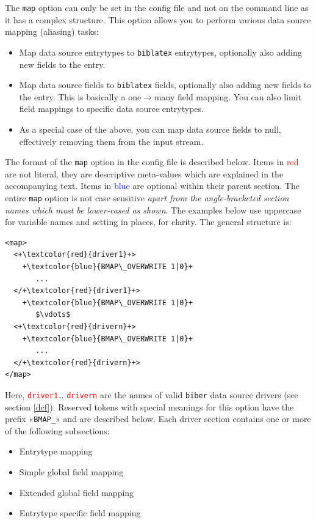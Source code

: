 \documentclass{ltxdockit}
\begin{document}
The \verb+map+ option can only be set in the config file
and not on the command line as it has a complex structure. This
option allows you to perform various data source mapping (aliasing)
tasks:

\begin{itemize}
\item Map data source entrytypes to \verb+biblatex+ entrytypes,
  optionally also adding new fields to the entry.
\item Map data source fields to \verb+biblatex+ fields,
  optionally also adding new fields to the entry. This is basically a
  one$\rightarrow$many field mapping. You can also limit field
  mappings to specific data source entrytypes.
\item As a special case of the above, you can map data source fields
  to null, effectively removing them from the input stream.
\end{itemize}

\noindent The format of the \verb+map+ option in the
config file is described below. Items in \textcolor{red}{red} are not
literal, they are descriptive meta-values which are explained in the
accompanying text. Items in \textcolor{blue}{blue} are optional within
their parent section. The entire \verb+map+ option is not case sensitive
\emph{apart from the angle-bracketed section names which must be
  lower-cased as shown}. The examples below use uppercase for variable names
and setting in places, for clarity. The general structure is:

\lstset{showspaces=false}
\begin{lstlisting}[escapechar=+,mathescape=true]
<map>
  <+\textcolor{red}{driver1}+>
    +\textcolor{blue}{BMAP\_OVERWRITE 1|0}+
       ...
  </+\textcolor{red}{driver1}+>
    +\textcolor{blue}{BMAP\_OVERWRITE 1|0}+
       $\vdots$
  <+\textcolor{red}{drivern}+>
    +\textcolor{blue}{BMAP\_OVERWRITE 1|0}+
       ...
  </+\textcolor{red}{drivern}+>
</map>
\end{lstlisting}

\noindent Here, \textcolor{red}{\texttt{driver1}}\ldots
\textcolor{red}{\texttt{drivern}} are the names of valid \verb+biber+ data
source drivers (see section \ref{dcf}). Reserved tokens with special meanings for
this option have the prefix «\verb+BMAP_+» and are described below. Each
driver section contains one or more of the following subsections:

\begin{itemize}
\item Entrytype mapping
\item Simple global field mapping
\item Extended global field mapping
\item Entrytype specific field mapping
\end{itemize}
\end{document}
